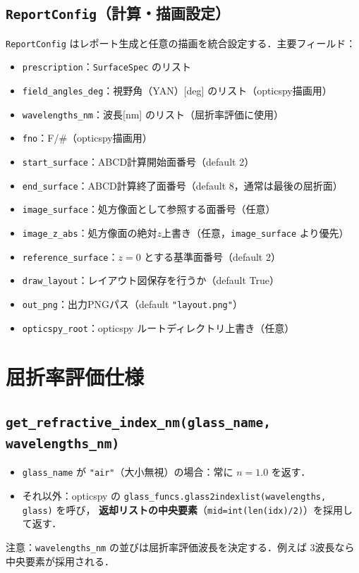 \documentclass[a4paper,11pt]{jsarticle} %
\begin{document}
\subsection{\texttt{ReportConfig}（計算・描画設定）}
\texttt{ReportConfig} はレポート生成と任意の描画を統合設定する．主要フィールド：
\begin{itemize}
  \item \texttt{prescription}：\texttt{SurfaceSpec} のリスト
  \item \texttt{field\_angles\_deg}：視野角（YAN）[deg] のリスト（opticspy描画用）
  \item \texttt{wavelengths\_nm}：波長[nm] のリスト（屈折率評価に使用）
  \item \texttt{fno}：F/\#（opticspy描画用）
  \item \texttt{start\_surface}：ABCD計算開始面番号（default 2）
  \item \texttt{end\_surface}：ABCD計算終了面番号（default 8，通常は最後の屈折面）
  \item \texttt{image\_surface}：処方像面として参照する面番号（任意）
  \item \texttt{image\_z\_abs}：処方像面の絶対$z$上書き（任意，\texttt{image\_surface} より優先）
  \item \texttt{reference\_surface}：$z=0$ とする基準面番号（default 2）
  \item \texttt{draw\_layout}：レイアウト図保存を行うか（default True）
  \item \texttt{out\_png}：出力PNGパス（default \texttt{"layout.png"}）
  \item \texttt{opticspy\_root}：opticspy ルートディレクトリ上書き（任意）
\end{itemize}

\section{屈折率評価仕様}
\subsection{\texttt{get\_refractive\_index\_nm(glass\_name, wavelengths\_nm)}}
\begin{itemize}
  \item \texttt{glass\_name} が \texttt{"air"}（大小無視）の場合：常に $n=1.0$ を返す．
  \item それ以外：opticspy の \texttt{glass\_funcs.glass2indexlist(wavelengths, glass)} を呼び，
        \textbf{返却リストの中央要素}（\texttt{mid=int(len(idx)/2)}）を採用して返す．
\end{itemize}
注意：\texttt{wavelengths\_nm} の並びは屈折率評価波長を決定する．例えば 3波長なら中央要素が採用される．
\end{document}
